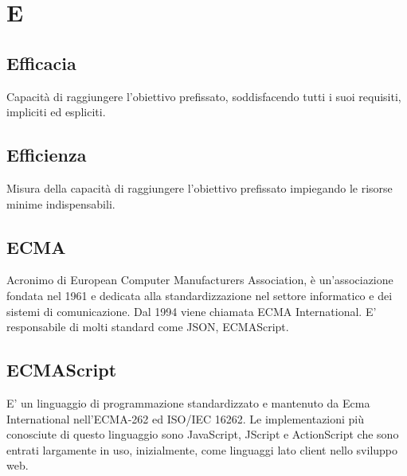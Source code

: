 \section*{E}

\subsection{Efficacia}
Capacità di raggiungere l'obiettivo prefissato, soddisfacendo tutti i suoi requisiti, impliciti ed espliciti.

\subsection{Efficienza}
Misura della capacità di raggiungere l'obiettivo prefissato impiegando le risorse minime indispensabili.

\subsection{ECMA}
Acronimo di European Computer Manufacturers Association, è un'associazione fondata nel 1961 e dedicata alla standardizzazione nel settore informatico e dei sistemi di comunicazione. Dal 1994 viene chiamata ECMA International. E' responsabile di molti standard come JSON, ECMAScript.

\subsection{ECMAScript}
E' un linguaggio di programmazione standardizzato e mantenuto da Ecma International nell'ECMA-262 ed ISO/IEC 16262. Le implementazioni più conosciute di questo linguaggio sono JavaScript, JScript e ActionScript che sono entrati largamente in uso, inizialmente, come linguaggi lato client nello sviluppo web.
